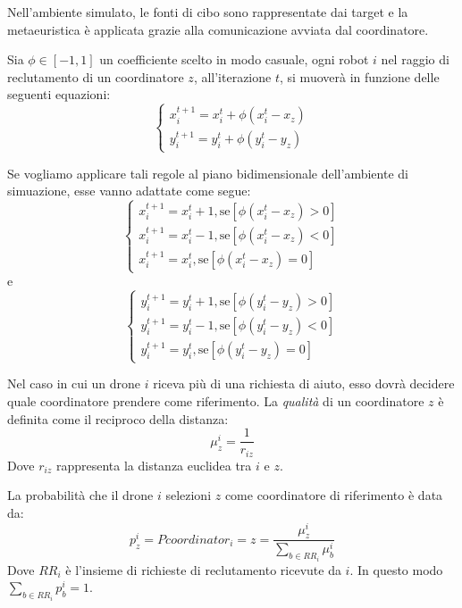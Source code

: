 Nell'ambiente simulato, le fonti di cibo sono rappresentate dai target e la metaeuristica è applicata grazie alla comunicazione avviata dal coordinatore.

Sia $\phi \in [-1,1]$ un coefficiente scelto in modo casuale, ogni robot $i$ nel raggio di reclutamento di un coordinatore $z$, all'iterazione $t$, si muoverà in funzione delle seguenti equazioni:
\begin{equation}
    \begin{cases}
        x_{i}^{t+1} = x_{i}^{t} + \phi (x_{i}^{t} - x_{z}) \\
        y_{i}^{t+1} = y_{i}^{t} + \phi (y_{i}^{t} - y_{z})    
    \end{cases}    
\end{equation}

Se vogliamo applicare tali regole al piano bidimensionale dell'ambiente di simuazione, esse vanno adattate come segue:
\begin{equation}
    \begin{cases}
        x_{i}^{t+1} = x_{i}^{t} + 1 , \text{se}[\phi (x_{i}^{t} - x_{z}) > 0]\\
        x_{i}^{t+1} = x_{i}^{t} - 1 , \text{se}[\phi (x_{i}^{t} - x_{z}) < 0]\\
        x_{i}^{t+1} = x_{i}^{t} , \text{se}[\phi (x_{i}^{t} - x_{z}) = 0]
    \end{cases}
\end{equation}
e
\begin{equation}
    \begin{cases}
        y_{i}^{t+1} = y_{i}^{t} + 1 , \text{se}[\phi (y_{i}^{t} - y_{z}) > 0]\\
        y_{i}^{t+1} = y_{i}^{t} - 1 , \text{se}[\phi (y_{i}^{t} - y_{z}) < 0]\\
        y_{i}^{t+1} = y_{i}^{t} , \text{se}[\phi (y_{i}^{t} - y_{z}) = 0]
    \end{cases}
\end{equation}

Nel caso in cui un drone $i$ riceva più di una richiesta di aiuto, esso dovrà decidere quale coordinatore prendere come riferimento.
La \textit{qualità} di un coordinatore $z$ è definita come il reciproco della distanza:
\begin{equation}
    \mu_{z}^{i} = \frac{1}{r_{iz}}
\end{equation}
Dove $r_{iz}$ rappresenta la distanza euclidea tra $i$ e $z$.

La probabilità che il drone $i$ selezioni $z$ come coordinatore di riferimento è data da:
\begin{equation}
    p_{z}^{i} = P{coordinator_{i} = z} = \frac{\mu_{z}^{i}}{\sum_{b \in RR_{i}} \mu_{b}^{i}}
\end{equation}
Dove $RR_{i}$ è l'insieme di richieste di reclutamento ricevute da $i$.
In questo modo $\sum_{b \in RR_{i}} p_{b}^{i} = 1$.

